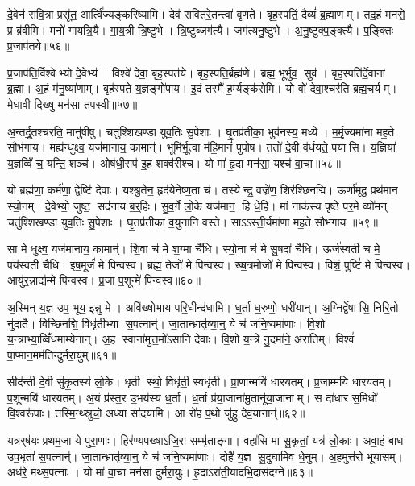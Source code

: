 दे॒वेन॑ सवि॒त्रा प्रसू॑त॒ आर्त्वि॑ज्यङ्करिष्यामि। देव॑ सवितरे॒तन्त्वा॑ वृणते। बृह॒स्पतिं॒ दैव्यं॑ ब्र॒ह्माणम्। तद॒हं मन॑से॒ प्र ब्र॑वीमि। मनो॑ गायत्रि॒यै। गा॒य॒त्री त्रि॒ष्टुभे। त्रि॒ष्टुब्जग॑त्यै। जग॑त्यनु॒ष्टुभे। अ॒नु॒ष्टुक्प॒ङ्क्त्यै। प॒ङ्क्तिः प्र॒जाप॑तये॥५६॥

प्र॒जाप॑ति॒र्विश्वेभ्यो दे॒वेभ्य॑। विश्वे॑ देवा॒ बृह॒स्पत॑ये। बृह॒स्पति॒र्ब्रह्म॑णे। ब्रह्म॒ भूर्भुव॒ सुव॑। बृह॒स्पति॑र्दे॒वानां ब्र॒ह्मा। अ॒हं म॑नु॒ष्या॑णाम्। बृह॑स्पते य॒ज्ञङ्गो॑पाय। इ॒दं तस्मै॑ ह॒र्म्यङ्क॑रोमि। यो वो॑ देवा॒श्चर॑ति ब्रह्म॒चर्यम्। मे॒धा॒वी दि॒ख्षु मन॑सा तप॒स्वी॥५७॥

अ॒न्तर्दू॒तश्च॑रति॒ मानु॑षीषु। चतु॑श्शिखण्डा युव॒तिः सु॒पेशाः। घृ॒तप्र॑तीका॒ भुव॑नस्य॒ मध्ये। म॒र्मृ॒ज्यमा॑ना मह॒ते सौभ॑गाय। मह्य॑न्धुक्ष्व॒ यज॑मानाय॒ कामान्॑। भूमि॑र्भू॒त्वा म॑हि॒मानं॑ पुपोष। ततो॑ दे॒वी व॑र्धयते॒ पयासि। य॒ज्ञिया॑ य॒ज्ञव्विँ च॒ यन्ति॒ शञ्च॑। ओष॑धी॒राप॑ इ॒ह शक्व॑रीश्च। यो मा॑ हृ॒दा मन॑सा॒ यश्च॑ वा॒चा॥५८॥

यो ब्रह्म॑णा॒ कर्म॑णा॒ द्वेष्टि॑ देवाः। यश्श्रु॒तेन॒ हृद॑येनेष्ण॒ता च॑। तस्येन्द्र॒ वज्रे॑ण॒ शिर॑श्छिनद्मि। ऊर्णा॑मृदु॒ प्रथ॑मान स्यो॒नम्। दे॒वेभ्यो॒ जुष्ट॒ सद॑नाय ब॒र्॒हिः। सु॒व॒र्गे लो॒के यज॑मान॒ हि धे॒हि। मां नाक॑स्य पृ॒ष्ठे प॑र॒मे व्यो॑मन्। चतु॑श्शिखण्डा युव॒तिः सु॒पेशाः। घृ॒तप्र॑तीका व॒युना॑नि वस्ते। साऽऽस्ती॒र्यमा॑णा मह॒ते सौभ॑गाय ॥५९॥

सा मे॑ धुक्ष्व॒ यज॑मानाय॒ कामान्॑। शि॒वा च॑ मे श॒ग्मा चै॑धि। स्यो॒ना च॑ मे सु॒षदा॑ चैधि। ऊर्ज॑स्वती च मे॒ पय॑स्वती चैधि। इष॒मूर्जं॑ मे पिन्वस्व। ब्रह्म॒ तेजो॑ मे पिन्वस्व। ख्ष॒त्रमोजो॑ मे पिन्वस्व। विशं॒ पुष्टिं॑ मे पिन्वस्व। आयु॑र॒न्नाद्य॑म्मे पिन्वस्व। प्र॒जां प॒शून्मे॑ पिन्वस्व॥६०॥

अ॒स्मिन् य॒ज्ञ उप॒ भूय॒ इन्नु मे। अवि॑ख्षोभाय परि॒धीन्द॑धामि। ध॒र्ता ध॒रुणो॒ धरी॑यान्। अ॒ग्निर्द्वेषासि॒ निरि॒तो नु॑दातै। विच्छि॑नद्मि॒ विधृ॑तीभ्या स॒पत्नान्॑। जा॒तान्भ्रातृ॑व्या॒न्॒ ये च॑ जनि॒ष्यमा॑णाः। वि॒शो य॒न्त्राभ्या॒व्विँध॑माम्येनान्। अ॒ह स्वाना॑मुत्त॒मो॑ऽसानि देवाः। वि॒शो य॒न्त्रे नु॒दमा॑ने॒ अरा॑तिम्। विश्वं॑ पा॒प्मान॒मम॑तिन्दुर्मरा॒युम्॥६१॥

सीद॑न्ती दे॒वी सु॑कृ॒तस्य॑ लो॒के। धृती स्थो॒ विधृ॑ती॒ स्वधृ॑ती। प्रा॒णान्मयि॑ धारयतम्। प्र॒जाम्मयि॑ धारयतम्। प॒शून्मयि॑ धारयतम्। अ॒यं प्र॑स्त॒र उ॒भय॑स्य ध॒र्ता। ध॒र्ता प्र॑या॒जाना॑मु॒तानू॑या॒जानाम्। स दा॑धार स॒मिधो॑ वि॒श्वरू॑पाः। तस्मि॒न्थ्स्रुचो॒ अध्या सा॑दयामि। आ रो॑ह प॒थो जु॑हु देव॒यानान्॑॥६२॥

यत्रर्‌ष॑यः प्रथम॒जा ये पु॑रा॒णाः। हिर॑ण्यपख्षाऽजि॒रा सम्भृ॑ताङ्गा। वहा॑सि मा सु॒कृतां॒ यत्र॑ लो॒काः। अवा॒हं बा॑ध उप॒भृता॑ स॒पत्नान्॑। जा॒तान्भ्रातृ॑व्या॒न्॒ ये च॑ जनि॒ष्यमा॑णाः। दोहै॑ य॒ज्ञ सु॒दुघा॑मिव धे॒नुम्। अ॒हमुत्त॑रो भूयासम्। अध॑रे॒ मथ्स॒पत्नाः। यो मा॑ वा॒चा मन॑सा दुर्मरा॒युः। हृ॒दाऽरा॑ती॒याद॑भि॒दास॑दग्ने॥६३॥

